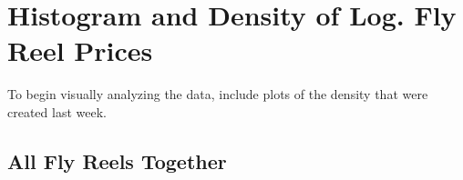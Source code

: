 %
%
%
%
%






\section{Histogram and Density of Log. Fly Reel Prices}

To begin visually analyzing the data, 
include plots of the density that were created last week.

\subsection{All Fly Reels Together}

